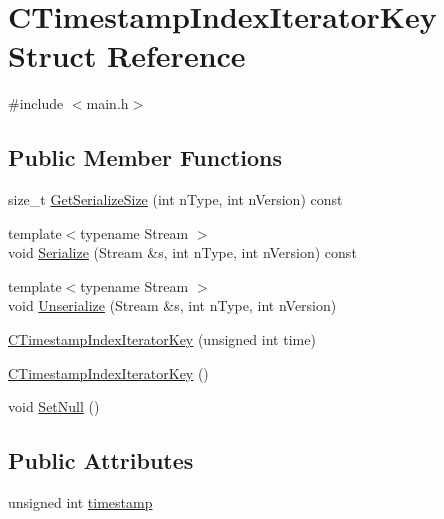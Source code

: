 \hypertarget{struct_c_timestamp_index_iterator_key}{}\section{C\+Timestamp\+Index\+Iterator\+Key Struct Reference}
\label{struct_c_timestamp_index_iterator_key}


{\ttfamily \#include $<$main.\+h$>$}

\subsection*{Public Member Functions}
\begin{DoxyCompactItemize}
\item 
size\+\_\+t \mbox{\hyperlink{struct_c_timestamp_index_iterator_key_a1d42134dc82c79ddd09c531a03625745}{Get\+Serialize\+Size}} (int n\+Type, int n\+Version) const
\item 
{\footnotesize template$<$typename Stream $>$ }\\void \mbox{\hyperlink{struct_c_timestamp_index_iterator_key_afa5a4c352cf42da8f3763ee0ca8362cd}{Serialize}} (Stream \&s, int n\+Type, int n\+Version) const
\item 
{\footnotesize template$<$typename Stream $>$ }\\void \mbox{\hyperlink{struct_c_timestamp_index_iterator_key_a3f47d6a35bfe323058960efdb0bf4f26}{Unserialize}} (Stream \&s, int n\+Type, int n\+Version)
\item 
\mbox{\hyperlink{struct_c_timestamp_index_iterator_key_ac2a4b02c30c039652296c1b5f81d67da}{C\+Timestamp\+Index\+Iterator\+Key}} (unsigned int time)
\item 
\mbox{\hyperlink{struct_c_timestamp_index_iterator_key_a56b41dc1f35b31ffd5654dae4a1a3298}{C\+Timestamp\+Index\+Iterator\+Key}} ()
\item 
void \mbox{\hyperlink{struct_c_timestamp_index_iterator_key_aafb4b94756345f2afcbb10559765466d}{Set\+Null}} ()
\end{DoxyCompactItemize}
\subsection*{Public Attributes}
\begin{DoxyCompactItemize}
\item 
unsigned int \mbox{\hyperlink{struct_c_timestamp_index_iterator_key_a9459c6d565851430bb2edcf6fc601292}{timestamp}}
\end{DoxyCompactItemize}


